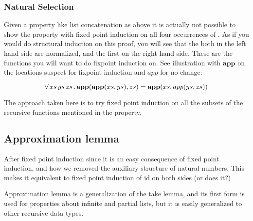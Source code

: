 \subsubsection{Natural Selection}

Given a property like list concatenation as above
it is actually not possible to show the property with fixed point
induction on all four occurrences of \hs{++}. As if you would do
structural induction on this proof, you will see that the both in the
left hand side are normalized, and the first on the right hand
side. These are the functions you will want to do fixpoint induction
on. See illustration with $\mathbf{app}$ on the locations suspect for
fixpoint induction and $app$ for no change:

\begin{equation*}
\forall \, xs \, ys \, zs \, . \, \mathbf{app}(\mathbf{app}(xs,ys),zs)
               =  \mathbf{app}(xs,app(ys,zs))
\end{equation*}

The approach taken here is to try fixed point induction on all the
subsets of the recursive functions mentioned in the property.

\subsection{Approximation lemma}

After fixed point induction since it is an easy consequence of fixed
point induction, and how we removed the auxiliary structure of natural
numbers. This makes it equivalent to fixed point induction of id on
both sides (or does it?)

Approximation lemma is a generalization of the take lemma, and its
first form is used for properties about infinite and partial lists,
but it is easily generalized to other recursive data types.


